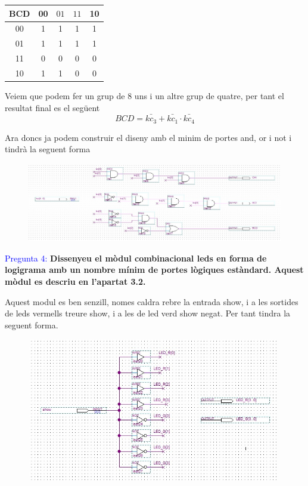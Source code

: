 \documentclass[12pt, a4papre]{article}
\begin{document}
	\begin{center}
	\begin{tabular}{c|| c c c c} 
	 BCD & 00 & $01$ &$11$ & 10\\ [0.5ex] 
	 \hline\hline
	 00 & 1 & 1 & 1 & 1\\ 

	 01 & 1 & 1  & 1 & 1\\

	 11 & 0 & 0 & 0 & 0\\

	 10 & 1 & 1 & 0 & 0\\
	\end{tabular}
	\end{center}
	
	Veiem que podem fer un grup de 8 uns i un altre grup de quatre, per tant el resultat final es el següent
	\[BCD = \bar{kc_3} + \bar{kc_1}\cdot \bar{kc_4}\]
	
	Ara doncs ja podem construir el diseny amb el minim de portes and, or i not i tindrà la seguent forma
	\begin{figure}[H]
		\begin{center}
		\includegraphics[width=130mm]{sel.jpeg}
		\end{center}
	\end{figure}
	
	\textcolor{blue}{Pregunta 4:} \textbf{Dissenyeu el mòdul combinacional leds en forma de logigrama amb un nombre mínim de portes lògiques estàndard. Aquest mòdul es descriu en l’apartat 3.2.}
	
	Aquest modul es ben senzill, nomes caldra rebre la entrada show, i a les sortides de leds vermells treure show, i a les de led verd show negat. Per tant tindra la seguent forma.
	\begin{figure}[H]
		\begin{center}
		\includegraphics[width=110mm]{leds.jpeg}
		\end{center}
	\end{figure}
	
	
	
	
\end{document}
